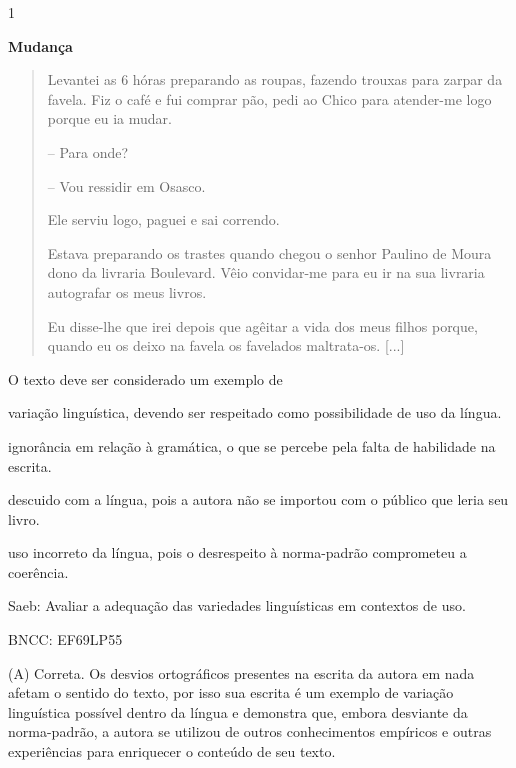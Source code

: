 \num{1}

\textbf{Mudança}

\begin{quote}
Levantei as 6 hóras preparando as roupas, fazendo trouxas para zarpar da
favela. Fiz o café e fui comprar pão, pedi ao Chico para atender-me logo
porque eu ia mudar.

-- Para onde?

-- Vou ressidir em Osasco.

Ele serviu logo, paguei e sai correndo.

Estava preparando os trastes quando chegou o senhor Paulino de Moura
dono da livraria Boulevard. Vêio convidar-me para eu ir na sua livraria
autografar os meus livros.

Eu disse-lhe que irei depois que agêitar a vida dos meus filhos porque,
quando eu os deixo na favela os favelados maltrata-os. {[}...{]}
\end{quote}


O texto deve ser considerado um exemplo de

\begin{escolha}
\item variação linguística, devendo ser respeitado como possibilidade de
uso da língua.

\item ignorância em relação à gramática, o que se percebe pela falta de
habilidade na escrita.

\item descuido com a língua, pois a autora não se importou com o público
que leria seu livro.

\item uso incorreto da língua, pois o desrespeito à norma-padrão
comprometeu a coerência.
\end{escolha}

Saeb: Avaliar a adequação das variedades linguísticas em contextos de
uso.

BNCC: EF69LP55

(A) Correta. Os desvios ortográficos presentes na escrita da autora em
nada afetam o sentido do texto, por isso sua escrita é um exemplo de
variação linguística possível dentro da língua e demonstra que, embora
desviante da norma-padrão, a autora se utilizou de outros conhecimentos
empíricos e outras experiências para enriquecer o conteúdo de seu texto.

